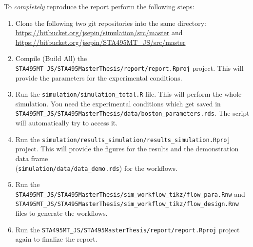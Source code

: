 \documentclass[11pt,a4paper,twoside]{book}\usepackage[]{graphicx}\usepackage[]{xcolor}
\begin{document}
To \textit{completely} reproduce the report perform the following steps:
\begin{enumerate}
\item Clone the following two git repositories into the same directory: \url{https://bitbucket.org/jsepin/simulation/src/master} and \url{https://bitbucket.org/jsepin/STA495MT_JS/src/master}
\item Compile (Build All) the \texttt{STA495MT\_JS/STA495MasterThesis/report/report.Rproj} project. This will provide the parameters for the experimental conditions.
\item Run the \texttt{simulation/simulation\_total.R} file. This will perform the whole simulation. You need the experimental conditions which get saved in \\ \texttt{STA495MT\_JS/STA495MasterThesis/data/boston\_parameters.rds}. The script will automatically try to access it.
\item Run the \texttt{simulation/results\_simulation/results\_simulation.Rproj} project. This will provide the figures for the results and the demonstration data frame \\(\texttt{simulation/data/data\_demo.rds}) for the workflows.
\item Run the \texttt{STA495MT\_JS/STA495MasterThesis/sim\_workflow\_tikz/flow\_para.Rnw} and \\\texttt{STA495MT\_JS/STA495MasterThesis/sim\_workflow\_tikz/flow\_design.Rnw} files to generate the workflows.
\item Run the \texttt{STA495MT\_JS/STA495MasterThesis/report/report.Rproj} project again to finalize the report.
\end{enumerate}
\end{document}
